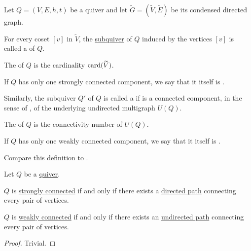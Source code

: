 \begin{definition}\label{def:quiver_connectedness}
  Let \( Q = (V, E, h, t) \) be a quiver and let \( \widetilde{G} = (\widetilde{V}, \widetilde{E}) \) be its condensed directed graph.

  \begin{thmenum}
     For every coset \( [v] \) in \( \widetilde{V} \), the \hyperref[def:hypergraph/submodels]{subquiver} of \( Q \) induced by the vertices \( [v] \) is called a  of \( Q \).

    The  of \( Q \) is the cardinality \( \operatorname{card}(\widetilde{V}) \).

    If \( Q \) has only one strongly connected component, we say that it itself is .

     Similarly, the subquiver \( Q' \) of \( Q \) is called a  if is a connected component, in the sense of , of the underlying undirected multigraph \( U(Q) \).

    The  of \( Q \) is the connectivity number of \( U(Q) \).

    If \( Q \) has only one weakly connected component, we say that it itself is .
  \end{thmenum}

  Compare this definition to .
\end{definition}

\begin{proposition}\label{thm:quiver_connectedness_via_chains}
  Let \( Q \) be a \hyperref[def:quiver]{quiver}.

  \begin{thmenum}
     \( Q \) is \hyperref[def:quiver_connectedness/strong]{strongly connected} if and only if there exists a \hyperref[def:quiver_path/directed]{directed path} connecting every pair of vertices.

     \( Q \) is \hyperref[def:quiver_connectedness/weak]{weakly connected} if and only if there exists an \hyperref[def:quiver_path/undirected]{undirected path} connecting every pair of vertices.
  \end{thmenum}
\end{proposition}
\begin{proof}
  Trivial.
\end{proof}

